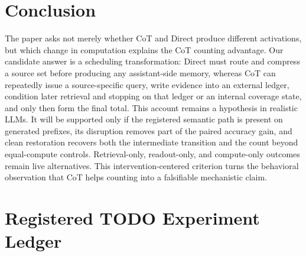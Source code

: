 \documentclass[11pt]{article}
\begin{document}
\section{Conclusion}

The paper asks not merely whether CoT and Direct produce different activations, but which change in computation explains the CoT counting advantage. Our candidate answer is a scheduling transformation: Direct must route and compress a source set before producing any assistant-side memory, whereas CoT can repeatedly issue a source-specific query, write evidence into an external ledger, condition later retrieval and stopping on that ledger or an internal coverage state, and only then form the final total. This account remains a hypothesis in realistic LLMs. It will be supported only if the registered semantic path is present on generated prefixes, its disruption removes part of the paired accuracy gain, and clean restoration recovers both the intermediate transition and the count beyond equal-compute controls. Retrieval-only, readout-only, and compute-only outcomes remain live alternatives. This intervention-centered criterion turns the behavioral observation that CoT helps counting into a falsifiable mechanistic claim.

\clearpage



\appendix
\section{Registered TODO Experiment Ledger}
\label{app:ledger}
\end{document}
